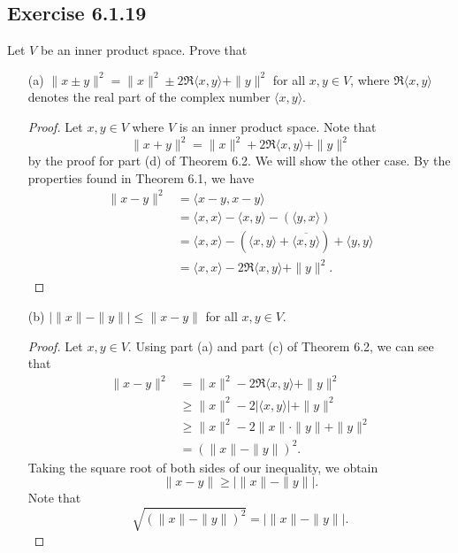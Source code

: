 \subsection*{Exercise 6.1.19} Let \( V  \) be an inner product space. Prove that
\begin{enumerate}
    \item[(a)] \( \|x \pm y\|^{2} = \|x\|^{2} \pm 2 \Re \langle x , y \rangle + \|y\|^{2}  \) for all \( x,y \in V  \), where \( \Re \langle x , y \rangle \) denotes the real part of the complex number \( \langle x , y \rangle \).
        \begin{proof}
        Let \( x,y \in V  \) where \( V  \) is an inner product space. Note that 
        \[  \|x + y\|^{2} = \|x\|^{2} + 2 \Re \langle x , y \rangle + \|y\|^{2} \]
        by the proof for part (d) of Theorem 6.2. We will show the other case. By the properties found in Theorem 6.1, we have
        \begin{align*}
            \|x - y\|^{2} &= \langle x - y  ,  x - y  \rangle \\
                          &= \langle x , x \rangle - \langle x , y \rangle - ( \langle y , x \rangle)  \\
                          &= \langle x , x \rangle - (\langle x , y \rangle + \overline{\langle x , y \rangle} ) + \langle y , y \rangle \\
                          &= \langle x , x \rangle - 2 \Re \langle x , y \rangle + \|y\|^{2}.
        \end{align*}
        \end{proof}
    \item[(b)] \( | \|x\| - \|y\| |  \leq \|x - y\| \) for all \( x,y \in V  \).
        \begin{proof}
            Let \( x,y \in V  \). Using part (a) and part (c) of Theorem 6.2, we can see that
            \begin{align*}
               \|x - y\|^{2}  &= \|x\|^{2} - 2 \Re \langle x , y \rangle + \|y\|^{2} \\
                              &\geq \|x\|^{2} - 2 |  \langle x , y \rangle | + \|y\|^{2} \\
                              &\geq \|x\|^{2} - 2 \|x\| \cdot \|y\| + \|y\|^{2} \tag{\( -2 | \langle x , y \rangle |  \geq -2 \|x\| \cdot \|y\| \)} \\ 
                              &= (\|x\| - \|y\|)^{2}.
            \end{align*}
            Taking the square root of both sides of our inequality, we obtain
            \[  \|x - y \| \geq |  \| x \| - \|y\| |. \]
            Note that 
            \[ \sqrt{ (\|x\| - \|y\|)^{2} } = | \|x\| - \|y\| |.    \]
        \end{proof}
\end{enumerate}


